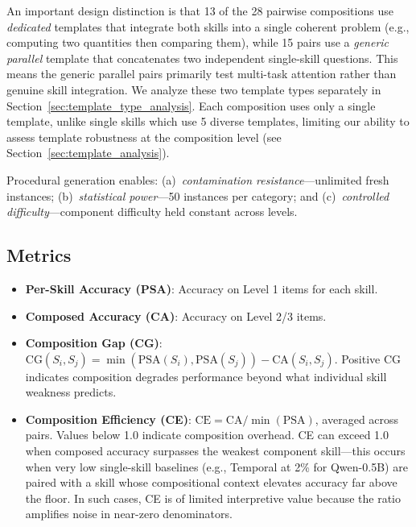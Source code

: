 \documentclass{article}
\begin{document}
An important design distinction is that 13 of the 28 pairwise compositions use \emph{dedicated} templates that integrate both skills into a single coherent problem (e.g., computing two quantities then comparing them), while 15 pairs use a \emph{generic parallel} template that concatenates two independent single-skill questions. This means the generic parallel pairs primarily test multi-task attention rather than genuine skill integration. We analyze these two template types separately in Section~\ref{sec:template_type_analysis}. Each composition uses only a single template, unlike single skills which use 5 diverse templates, limiting our ability to assess template robustness at the composition level (see Section~\ref{sec:template_analysis}).

Procedural generation enables: (a)~\emph{contamination resistance}---unlimited fresh instances; (b)~\emph{statistical power}---50 instances per category; and (c)~\emph{controlled difficulty}---component difficulty held constant across levels.

\subsection{Metrics}
\label{sec:metrics}

\begin{itemize}
    \item \textbf{Per-Skill Accuracy (PSA)}: Accuracy on Level 1 items for each skill.
    \item \textbf{Composed Accuracy (CA)}: Accuracy on Level 2/3 items.
    \item \textbf{Composition Gap (CG)}: $\text{CG}(S_i, S_j) = \min(\text{PSA}(S_i), \text{PSA}(S_j)) - \text{CA}(S_i, S_j)$. Positive CG indicates composition degrades performance beyond what individual skill weakness predicts.
    \item \textbf{Composition Efficiency (CE)}: $\text{CE} = \text{CA} / \min(\text{PSA})$, averaged across pairs. Values below 1.0 indicate composition overhead. CE can exceed 1.0 when composed accuracy surpasses the weakest component skill---this occurs when very low single-skill baselines (e.g., Temporal at 2\% for Qwen-0.5B) are paired with a skill whose compositional context elevates accuracy far above the floor. In such cases, CE is of limited interpretive value because the ratio amplifies noise in near-zero denominators.
\end{itemize}

\end{document}
